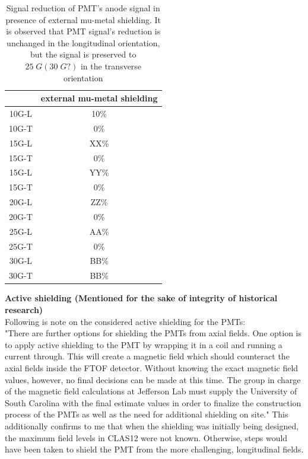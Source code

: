 \documentclass[12pt]{article}
\begin{document}
\begin{table}[H]
	\begin{center}
		\begin{tabular}{|c|c|}
			\hline
	 		& external mu-metal shielding \\
			\hline
 			10G-L & 10\% \\
 			10G-T & 0\% \\ 
 			\hline
 			15G-L & XX\% \\
 			15G-T & 0\% \\
 			\hline
 			15G-L & YY\% \\
 			15G-T & 0\% \\
 			\hline
 			20G-L & ZZ\% \\
 			20G-T & 0\% \\
 			\hline
 			25G-L & AA\% \\
 			25G-T & 0\% \\
 			\hline
 			30G-L & BB\% \\
 			30G-T & BB\% \\
 			\hline
		\end{tabular}
	\end{center}
	\caption{Signal reduction of PMT's anode signal in presence of external mu-metal shielding. It is observed that PMT signal's reduction is unchanged in the longitudinal orientation, but the signal is preserved to $25\;G(30\;G?)$ in the transverse orientation}
\end{table}
\newpage

\textbf{Active shielding (Mentioned for the sake of integrity of historical research)} \\
Following is note on the considered active shielding for the PMTs:\\
\newline
"There are further options for shielding the PMTs from axial fields. One option is to apply active shielding to the PMT by wrapping it in a coil and running a current through. This will create a magnetic field which should counteract the axial fields inside the FTOF detector. Without knowing the exact magnetic field values, however, no final decisions can be made at this time. The group in charge of the magnetic field calculations at Jefferson Lab must supply the University of South Carolina with the final estimate values in order to finalize the  construction process of the PMTs as well as the need for additional shielding on site."
\newline
This additionally confirms to me that when the shielding was initially being designed, the maximum field levels in CLAS12 were not known. Otherwise, steps would have been taken to shield the PMT from the more challenging, longitudinal fields.
\end{document}
